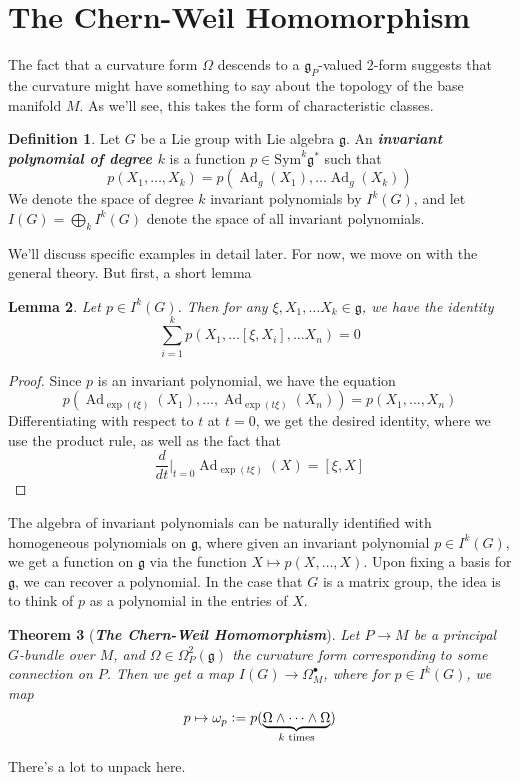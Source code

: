 \documentclass[psamsfonts, 12pt]{amsart}
\newtheorem{thm}{Theorem}[section]
\newtheorem{lem}[thm]{Lemma}
\theoremstyle{definition}
\newtheorem{defn}[thm]{Definition}
\theoremstyle{remark}
\newcommand{\ib}[1]{\textbf{\textit{#1}}}
\newcommand{\g}{\mathfrak{g}}
\newcommand{\defeq}{\vcentcolon=}
\DeclareMathOperator{\Ad}{Ad}
\begin{document}
\section{The Chern-Weil Homomorphism}
%
The fact that a curvature form $\Omega$ descends to a $\g_P$-valued $2$-form
suggests that the curvature might have something to say about the topology
of the base manifold $M$. As we'll see, this takes the form of characteristic
classes.
%
\begin{defn}
Let $G$ be a Lie group with Lie algebra $\g$. An \ib{invariant polynomial of degree $k$}
is a function $p \in \mathrm{Sym}^k\g^*$ such that
\[
p(X_1, \ldots, X_k) = p(\Ad_g(X_1), \ldots \Ad_g(X_k))
\]
We denote the space of degree $k$ invariant polynomials by $I^k(G)$, and
let $I(G) = \bigoplus_k I^k(G)$ denote the space of all invariant polynomials.
\end{defn}
%
We'll discuss specific examples in detail later. For now, we move on with the general
theory. But first, a short lemma
%
\begin{lem}
Let $p \in I^k(G)$. Then for any $\xi, X_1, \ldots X_k \in \g$, we have the identity
\[
\sum_{i=1}^k p(X_1, \ldots [\xi, X_i], \ldots X_n) = 0
\]
\end{lem}
%
\begin{proof}
Since $p$ is an invariant polynomial, we have the equation
\[
p(\Ad_{\exp(t\xi)}(X_1),\ldots,\Ad_{\exp(t\xi)}(X_n)) = p(X_1,\ldots,X_n)
\]
Differentiating with respect to $t$ at $t=0$, we get the desired identity, where
we use the product rule, as well as the fact that
\[
\frac{d}{dt}\bigg\vert_{t=0}\Ad_{\exp(t\xi)}(X) = [\xi,X]
\]
\end{proof}
%
The algebra of invariant polynomials can be naturally identified with homogeneous
polynomials on $\g$, where given an invariant polynomial $p \in I^k(G)$, we get a
function on $\g$ via the function $X \mapsto p(X, \ldots, X)$. Upon fixing a basis
for $\g$, we can recover a polynomial. In the case that $G$ is a matrix group, the idea
is to think of $p$ as a polynomial in the entries of $X$.
%
\begin{thm}[\ib{The Chern-Weil Homomorphism}]
Let $P \to M$ be a principal $G$-bundle over $M$, and $\Omega \in \Omega^2_P(\g)$
the curvature form corresponding to some connection on $P$. Then we get a map
$I(G) \to \Omega^\bullet_M$, where for $p \in I^k(G)$, we map
\[
p \mapsto \omega_p \defeq
p(\underbrace{\Omega \wedge \cdots \wedge \Omega}_{k \text{ times}})
\]
\end{thm}
%
There's a lot to unpack here.
\end{document}
